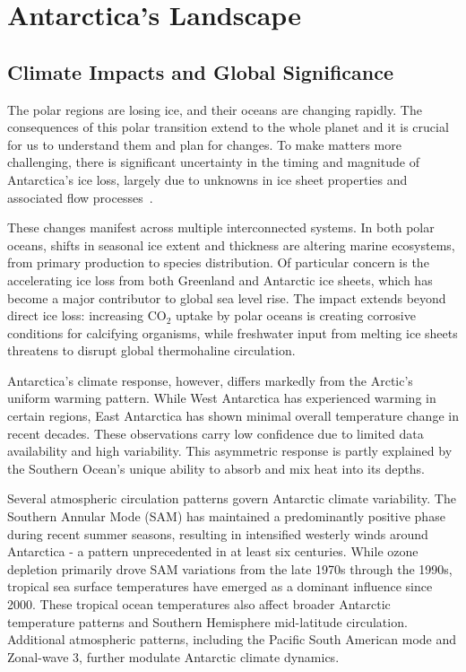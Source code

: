 \chapter*{Antarctica's Landscape}\label{why}
\section*{Climate Impacts and Global Significance}

The polar regions are losing ice, and their oceans are changing rapidly\cite{O_C_in_changingClimate}. The consequences of this polar transition extend to the whole planet and it is crucial for us to understand them and plan for changes. To make matters more challenging, there is significant uncertainty in the timing and magnitude of Antarctica's ice loss, largely due to unknowns in ice sheet properties and associated flow processes~\cite{IPCC}.

These changes manifest across multiple interconnected systems. In both polar oceans, shifts in seasonal ice extent and thickness are altering marine ecosystems, from primary production to species distribution\cite{O_C_in_changingClimate}. Of particular concern is the accelerating ice loss from both Greenland and Antarctic ice sheets, which has become a major contributor to global sea level rise\cite{O_C_in_changingClimate}. The impact extends beyond direct ice loss: increasing $\mathrm{CO_2}$ uptake by polar oceans is creating corrosive conditions for calcifying organisms\cite{O_C_in_changingClimate}, while freshwater input from melting ice sheets threatens to disrupt global thermohaline circulation\cite{Jacobs_2004}.

Antarctica's climate response, however, differs markedly from the Arctic's uniform warming pattern. While West Antarctica has experienced warming in certain regions, East Antarctica has shown minimal overall temperature change in recent decades. These observations carry low confidence due to limited data availability and high variability\cite{O_C_in_changingClimate}. This asymmetric response is partly explained by the Southern Ocean's unique ability to absorb and mix heat into its depths\cite{L_T_C_C}.
 
Several atmospheric circulation patterns govern Antarctic climate variability. The Southern Annular Mode (SAM) has maintained a predominantly positive phase during recent summer seasons, resulting in intensified westerly winds around Antarctica - a pattern unprecedented in at least six centuries. While ozone depletion primarily drove SAM variations from the late 1970s through the 1990s, tropical sea surface temperatures have emerged as a dominant influence since 2000\cite{O_C_in_changingClimate}. These tropical ocean temperatures also affect broader Antarctic temperature patterns and Southern Hemisphere mid-latitude circulation\cite{Jacobs_2004}. Additional atmospheric patterns, including the Pacific South American mode and Zonal-wave 3, further modulate Antarctic climate dynamics.

